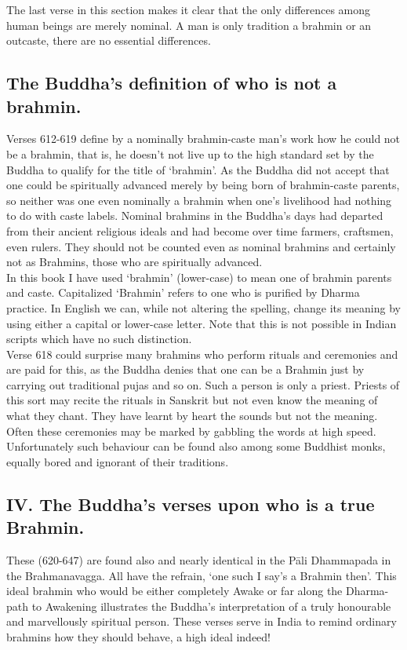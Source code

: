 The last verse in this section makes it clear that the only differences among human beings are merely nominal. A man is only tradition a brahmin or an outcaste, there are no essential differences.

\subsection{The Buddha's definition of who is not a brahmin.}
Verses 612-619 define by a nominally brahmin-caste man's work how he could not be a brahmin, that is, he doesn't not live up to the high standard set by the Buddha to qualify for the title of `brahmin'. As the Buddha did not accept that one could be spiritually advanced merely by being born of brahmin-caste parents, so neither was one even nominally a brahmin when one's livelihood had nothing to do with caste labels. Nominal brahmins in the Buddha's days had departed from their ancient religious ideals and had become over time farmers, craftsmen, even rulers. They should not be counted even as nominal brahmins and certainly not as Brahmins, those who are spiritually advanced.\\

In this book I have used `brahmin' (lower-case) to mean one of brahmin parents and caste. Capitalized `Brahmin' refers to one who is purified by Dharma practice. In English we can, while not altering the spelling, change its meaning by using either a capital or lower-case letter. Note that this is not possible in Indian scripts which have no such distinction.\\

Verse 618 could surprise many brahmins who perform rituals and ceremonies and are paid for this, as the Buddha denies that one can be a Brahmin just by carrying out traditional pujas and so on. Such a person is only a priest. Priests of this sort may recite the rituals in Sanskrit but not even know the meaning of what they chant. They have learnt by heart the sounds but not the meaning. Often these ceremonies may be marked by gabbling the words at high speed. Unfortunately such behaviour can be found also among some Buddhist monks, equally bored and ignorant of their traditions. 

\subsection{IV. The Buddha's verses upon who is a true Brahmin.}
These (620-647) are found also and nearly identical in the P\=ali Dhammapada in the Brahmanavagga. All have the refrain, `one such I say's a Brahmin then'. This ideal brahmin who would be either completely Awake or far along the Dharma-path to Awakening illustrates the Buddha's interpretation of a truly honourable and marvellously spiritual person. These verses serve in India to remind ordinary brahmins how they should behave, a high ideal indeed!\\

